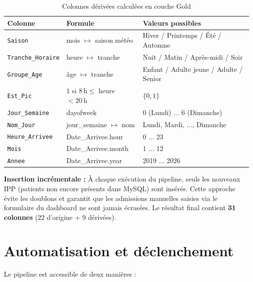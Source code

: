 \documentclass[12pt,a4paper]{report}
\begin{document}
	\begin{table}[H]
		\centering
		\caption{Colonnes dérivées calculées en couche Gold}
		\renewcommand{\arraystretch}{1.2}
		\begin{tabular}{lll}
			\toprule
			\textbf{Colonne} & \textbf{Formule} & \textbf{Valeurs possibles} \\
			\midrule
			\texttt{Saison}           & mois $\mapsto$ saison météo          & Hiver / Printemps / Été / Automne \\
			\texttt{Tranche\_Horaire} & heure $\mapsto$ tranche             & Nuit / Matin / Après-midi / Soir \\
			\texttt{Groupe\_Age}      & âge $\mapsto$ tranche               & Enfant / Adulte jeune / Adulte / Senior \\
			\texttt{Est\_Pic}         & $1$ si $8\,\text{h} \leq$ heure $< 20\,\text{h}$     & $\{0, 1\}$ \\
			\texttt{Jour\_Semaine}    & dayofweek                           & 0 (Lundi) ... 6 (Dimanche) \\
			\texttt{Nom\_Jour}        & jour\_semaine $\mapsto$ nom         & Lundi, Mardi, ..., Dimanche \\
			\texttt{Heure\_Arrivee}   & Date\_Arrivee.hour                  & 0 ... 23 \\
			\texttt{Mois}             & Date\_Arrivee.month                 & 1 ... 12 \\
			\texttt{Annee}            & Date\_Arrivee.year                  & 2019 ... 2026 \\
			\bottomrule
		\end{tabular}
	\end{table}
	
	\begin{successbox}
		\textbf{Insertion incrémentale :} À chaque exécution du pipeline, seuls les nouveaux
		IPP (patients non encore présents dans MySQL) sont insérés. Cette approche évite les
		doublons et garantit que les admissions manuelles saisies via le formulaire du dashboard
		ne sont jamais écrasées. Le résultat final contient \textbf{31 colonnes} (22 d'origine + 9 dérivées).
	\end{successbox}
	\newpage
	\section{Automatisation et déclenchement}
	
	Le pipeline est accessible de deux manières :
	
\end{document}
